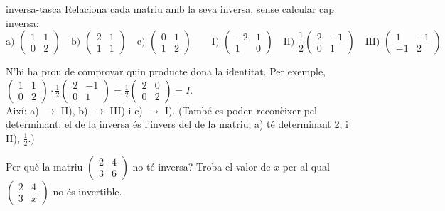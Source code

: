 \begin{apartats}
\begin{tria}{inversa-tasca}
Relaciona cada matriu amb la seva inversa, sense calcular cap inversa:
\[
\text{a) }\begin{pmatrix}1&1\\0&2\end{pmatrix}\quad
\text{b) }\begin{pmatrix}2&1\\1&1\end{pmatrix}\quad
\text{c) }\begin{pmatrix}0&1\\1&2\end{pmatrix}\qquad
\text{I) }\begin{pmatrix}-2&1\\1&0\end{pmatrix}\quad
\text{II) }\frac12\begin{pmatrix}2&-1\\0&1\end{pmatrix}\quad
\text{III) }\begin{pmatrix}1&-1\\-1&2\end{pmatrix}
\]

\begin{solucio}
N'hi ha prou de comprovar quin producte dona la identitat. Per exemple,
$\begin{pmatrix}1&1\\0&2\end{pmatrix}\cdot\frac12\begin{pmatrix}2&-1\\0&1\end{pmatrix}
=\frac12\begin{pmatrix}2&0\\0&2\end{pmatrix}=I$.\\
Així: a) $\to$ II), b) $\to$ III) i c) $\to$ I). (També es poden reconèixer pel determinant: el de la
inversa és l'invers del de la matriu; a) té determinant 2, i II), $\frac12$.)
\end{solucio}
\end{tria}

\begin{nomesllarg}
Per què la matriu $\begin{pmatrix}2&4\\3&6\end{pmatrix}$ no té inversa? Troba el valor de $x$ per al qual
$\begin{pmatrix}2&4\\3&x\end{pmatrix}$ no és invertible.


\end{nomesllarg}
\end{apartats}
